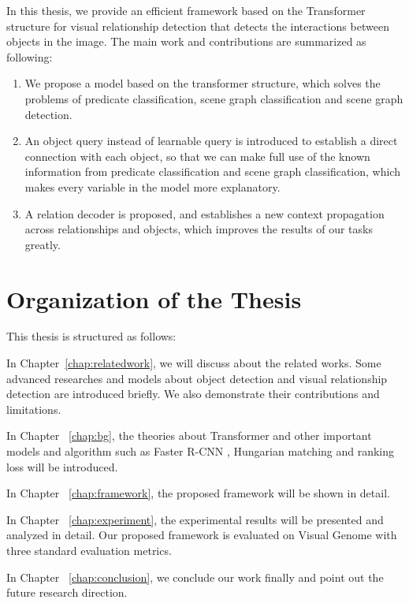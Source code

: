 In this thesis, we provide  an efficient framework based on the  Transformer structure  for visual relationship detection that detects the interactions between objects in the image. The main work and contributions are summarized as following:
\begin{enumerate}[\qquad  1.]
	\item We propose a model based on the transformer structure, which solves the problems of predicate classification, scene graph classification and scene graph detection.
	\item An object query instead of learnable query is introduced to establish a direct connection with each object, so that we can make full use of the known information from predicate classification and scene graph classification, which makes every variable in the model more explanatory.
	\item A relation decoder is proposed, and establishes a new context propagation across relationships and objects, which improves the results of our tasks greatly.
\end{enumerate}


\section{Organization of the Thesis}
This thesis is structured as follows:

In Chapter~\ref{chap:relatedwork}, we will discuss about the related works. Some advanced researches and models about object detection and visual relationship detection are introduced briefly. We also demonstrate their contributions and limitations.

In Chapter ~\ref{chap:bg}, the theories about Transformer and other important models and algorithm such as Faster R-CNN , Hungarian matching and ranking loss  will be introduced.

In Chapter ~\ref{chap:framework}, the proposed framework will be shown in detail.

In Chapter ~\ref{chap:experiment}, the experimental results will be presented and analyzed in detail. Our proposed framework is evaluated on Visual Genome with three standard evaluation metrics.

In Chapter ~\ref{chap:conclusion}, we conclude our work finally and point out the future research direction.
